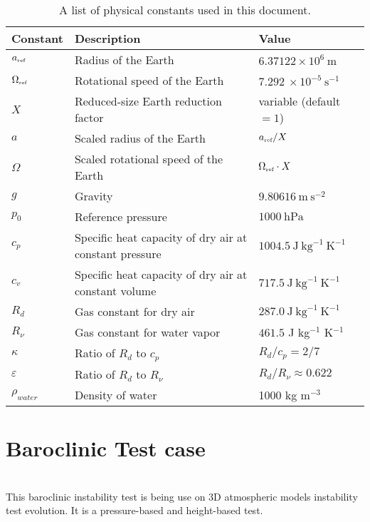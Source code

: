 \documentclass{article}
\begin{document}
\begin{table}[h]
\caption{A list of physical constants used in this document.} \label{tab:PhysicalConstants}
\begin{tabular*}{\textwidth}{@{\extracolsep{\fill}}lll}
\hline Constant & Description & Value \\
\hline $a_{\tiny \mbox{ref}}$ & Radius of the Earth & $6.37122 \times 10^{6}\ \mbox{m}$ \\
$\Omega_{\tiny \mbox{ref}}$ & Rotational speed of the Earth & $7.292\ \times 10^{-5}\ \mbox{s}^{-1}$ \\
$X$ & Reduced-size Earth reduction factor & variable (default $= 1$) \\
$a$ & Scaled radius of the Earth & $a_{\tiny \mbox{ref}} / X$ \\
$\Omega$ & Scaled rotational speed of the Earth & $\Omega_{\tiny \mbox{ref}} \cdot X$ \\
$g$ & Gravity & $9.80616\ \mbox{m}\ \mbox{s}^{-2}$ \\
$p_0$ & Reference pressure & $1000\ \mbox{hPa}$ \\
$c_p$ & Specific heat capacity of dry air at constant pressure & $1004.5\ \mbox{J}\ \mbox{kg}^{-1}\ \mbox{K}^{-1}$ \\
$c_v$ & Specific heat capacity of dry air at constant volume & $717.5\ \mbox{J}\ \mbox{kg}^{-1}\ \mbox{K}^{-1}$ \\
$R_d$ & Gas constant for dry air & $287.0\ \mbox{J}\ \mbox{kg}^{-1}\ \mbox{K}^{-1}$ \\
$R_\nu$ & Gas constant for water vapor & $461.5$ J kg$^{-1}$ K$^{-1}$ \\
$\kappa$ & Ratio of $R_d$ to $c_p$ & $R_d/c_p = 2/7$ \\
$\varepsilon$ & Ratio of $R_d$ to $R_\nu$ & $R_d/R_\nu \approx 0.622$ \\
$\rho_{water}$ & Density of water & 1000 kg m$^{-3}$ \\
\hline 
\end{tabular*}

\end{table}

\clearpage
\section{Baroclinic Test case}   
 


~\\ This baroclinic instability test is being use on 3D atmospheric models instability test evolution. It is a pressure-based and height-based test. 
\end{document}
